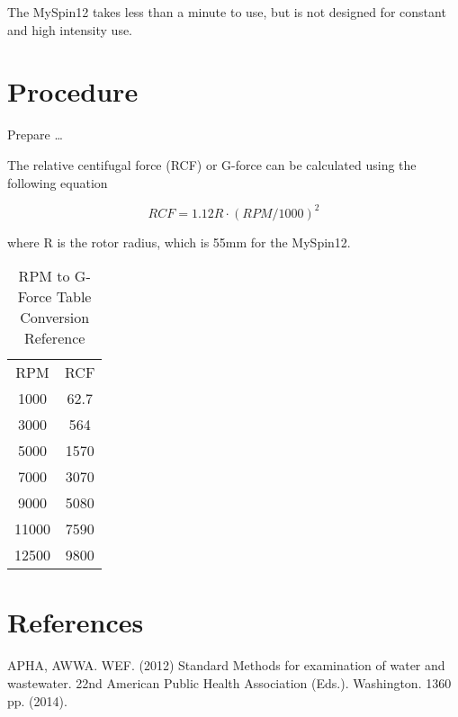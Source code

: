 \documentclass[12pt]{../SOP2}
\begin{document}
\NP The MySpin12 takes less than a minute to use, but is not designed for constant and high intensity use. 

\section{Procedure}

\NP Prepare \dots

\NP

The relative centifugal force (RCF) or G-force can be calculated using the following equation

\begin{equation}
RCF = 1.12 R \cdot (RPM/1000)^2
\end{equation}

\noindent where R is the rotor radius, which is 55mm for the MySpin12.

\begin{table}[h]
\centering
\caption{RPM to G-Force Table Conversion Reference}
\begin{tabular}{cc}
RPM   &   RCF   \\
1000  &   62.7          \\
3000  &   564           \\
5000  &   1570          \\
7000  &   3070          \\
9000  &   5080          \\
11000 &   7590          \\
12500 &   9800          \\
\end{tabular}
\end{table}


\section{References}

\NP APHA, AWWA. WEF. (2012) Standard Methods for examination of water and wastewater. 22nd American Public Health Association (Eds.). Washington. 1360 pp. (2014).
\end{document}
